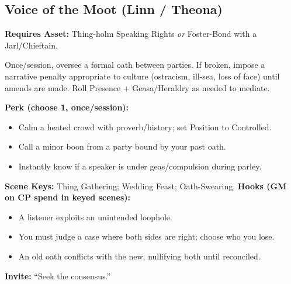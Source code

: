\subsection{Voice of the Moot (Linn / Theona)}
\textbf{Requires Asset:} Thing-holm Speaking Rights \emph{or} Foster-Bond with a Jarl/Chieftain.
\begin{tcolorbox}[enhanced,sharp corners,boxrule=.6pt,title={Talent — Word-Bond (6 XP)}]
Once/session, oversee a formal oath between parties. If broken, impose a narrative penalty appropriate to culture (ostracism, ill-sea, loss of face) until amends are made. Roll Presence + Geasa/Heraldry as needed to mediate.
\end{tcolorbox}
\textbf{Perk (choose 1, once/session):}
\begin{itemize}
  \item Calm a heated crowd with proverb/history; set Position to Controlled.
  \item Call a minor boon from a party bound by your past oath.
  \item Instantly know if a speaker is under geas/compulsion during parley.
\end{itemize}
\textbf{Scene Keys:} Thing Gathering; Wedding Feast; Oath-Swearing.
\textbf{Hooks (GM on CP spend in keyed scenes):}
\begin{itemize}
  \item A listener exploits an unintended loophole.
  \item You must judge a case where both sides are right; choose who you lose.
  \item An old oath conflicts with the new, nullifying both until reconciled.
\end{itemize}
\textbf{Invite:} “Seek the consensus.”

